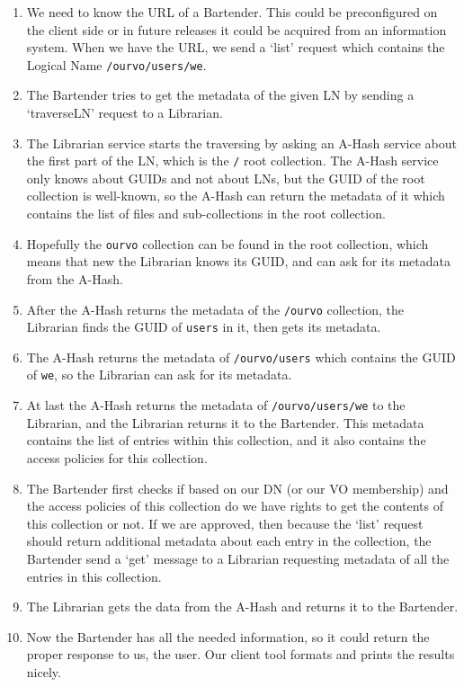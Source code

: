 \documentclass{book}
\begin{document}
\begin{enumerate}
    \item We need to know the URL of a Bartender. This could be preconfigured on the client side or in future releases it could be acquired from an information system. When we have the URL, we send a `list' request which contains the Logical Name \verb!/ourvo/users/we!.
    \item The Bartender tries to get the metadata of the given LN by sending a `traverseLN' request to a Librarian.
    \item The Librarian service starts the traversing by asking an A-Hash service about the first part of the LN, which is the \verb!/! root collection. The A-Hash service only knows about GUIDs and not about LNs, but the GUID of the root collection is well-known, so the A-Hash can return the metadata of it which contains the list of files and sub-collections in the root collection.
    \item Hopefully the \verb!ourvo! collection can be found in the root collection, which means that new the Librarian knows its GUID, and can ask for its metadata from the A-Hash.
    \item After the A-Hash returns the metadata of the \verb!/ourvo! collection, the Librarian finds the GUID of \verb!users! in it, then gets its metadata.
    \item The A-Hash returns the metadata of \verb!/ourvo/users! which contains the GUID of \verb!we!, so the Librarian can ask for its metadata.
    \item At last the A-Hash returns the metadata of \verb!/ourvo/users/we! to the Librarian, and the Librarian returns it to the Bartender. This metadata contains the list of entries within this collection, and it also contains the access policies for this collection.
    \item The Bartender first checks if based on our DN (or our VO membership) and the access policies of this collection do we have rights to get the contents of this collection or not. If we are approved, then because the `list' request should return additional metadata about each entry in the collection, the Bartender send a `get' message to a Librarian requesting metadata of all the entries in this collection.
    \item The Librarian gets the data from the A-Hash and returns it to the Bartender.
    \item Now the Bartender has all the needed information, so it could return the proper response to us, the user. Our client tool formats and prints the results nicely.
\end{enumerate}
\end{document}
